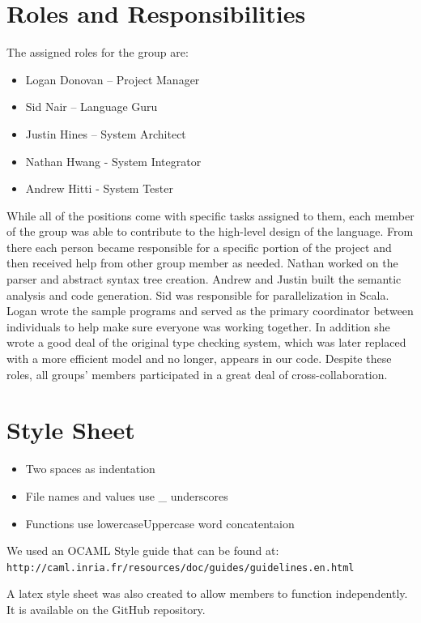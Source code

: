 \section{Roles and Responsibilities}
The assigned roles for the group are:
\begin{itemize}
\item Logan Donovan – Project Manager
\item Sid Nair – Language Guru
\item Justin Hines – System Architect
\item Nathan Hwang - System Integrator
\item Andrew Hitti	- System Tester
\end{itemize}

While all of the positions come with specific tasks assigned to them, each member of the group was able to contribute to the high-level design of the language.  From there each person became responsible for a specific portion of the project and then received help from other group member as needed. Nathan worked on the parser and abstract syntax tree creation. Andrew and Justin built the semantic analysis and code generation. Sid was responsible for parallelization in Scala. Logan wrote the sample programs and served as the primary coordinator between individuals to help make sure everyone was working together. In addition she wrote a good deal of the original type checking system, which was later replaced with a more efficient model and no longer, appears in our code. Despite these roles, all groups' members participated in a great deal of cross-collaboration.

\section{Style Sheet}
\begin{itemize}
\item Two spaces as indentation 
\item File names and values use \_ underscores
\item Functions use lowercaseUppercase word concatentaion 
\end{itemize}

We used an OCAML Style guide that can be found at:
\\ \verb=http://caml.inria.fr/resources/doc/guides/guidelines.en.html=

A latex style sheet was also created to allow members to function independently. It is available on the GitHub repository.
